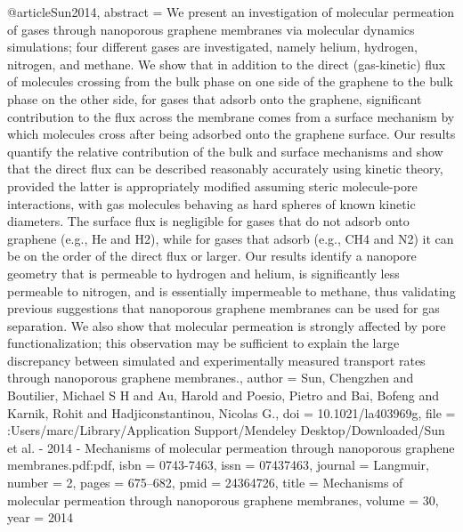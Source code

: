 @article{Sun2014,
abstract = {We present an investigation of molecular permeation of gases through nanoporous graphene membranes via molecular dynamics simulations; four different gases are investigated, namely helium, hydrogen, nitrogen, and methane. We show that in addition to the direct (gas-kinetic) flux of molecules crossing from the bulk phase on one side of the graphene to the bulk phase on the other side, for gases that adsorb onto the graphene, significant contribution to the flux across the membrane comes from a surface mechanism by which molecules cross after being adsorbed onto the graphene surface. Our results quantify the relative contribution of the bulk and surface mechanisms and show that the direct flux can be described reasonably accurately using kinetic theory, provided the latter is appropriately modified assuming steric molecule-pore interactions, with gas molecules behaving as hard spheres of known kinetic diameters. The surface flux is negligible for gases that do not adsorb onto graphene (e.g., He and H2), while for gases that adsorb (e.g., CH4 and N2) it can be on the order of the direct flux or larger. Our results identify a nanopore geometry that is permeable to hydrogen and helium, is significantly less permeable to nitrogen, and is essentially impermeable to methane, thus validating previous suggestions that nanoporous graphene membranes can be used for gas separation. We also show that molecular permeation is strongly affected by pore functionalization; this observation may be sufficient to explain the large discrepancy between simulated and experimentally measured transport rates through nanoporous graphene membranes.},
author = {Sun, Chengzhen and Boutilier, Michael S H and Au, Harold and Poesio, Pietro and Bai, Bofeng and Karnik, Rohit and Hadjiconstantinou, Nicolas G.},
doi = {10.1021/la403969g},
file = {:Users/marc/Library/Application Support/Mendeley Desktop/Downloaded/Sun et al. - 2014 - Mechanisms of molecular permeation through nanoporous graphene membranes.pdf:pdf},
isbn = {0743-7463},
issn = {07437463},
journal = {Langmuir},
number = {2},
pages = {675--682},
pmid = {24364726},
title = {{Mechanisms of molecular permeation through nanoporous graphene membranes}},
volume = {30},
year = {2014}
}
